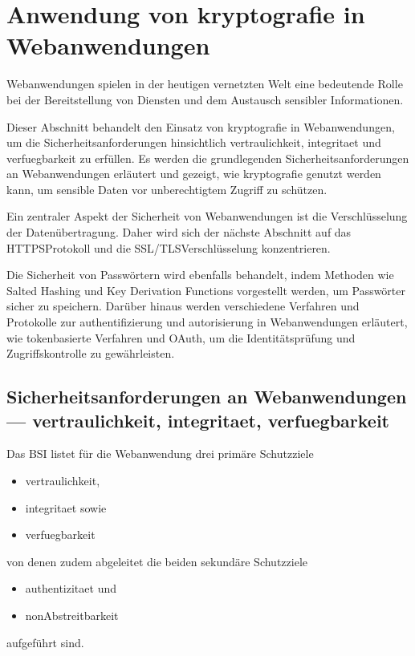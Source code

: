 \newpage
\section[Anwendung von Kryptografie in Webanwendungen]{Anwendung von \gls{kryptografie} in Webanwendungen}\label{sec:anwendung_von_kryptografie_in_webanwendungen}
Webanwendungen spielen in der heutigen vernetzten Welt eine bedeutende Rolle bei der Bereitstellung von Diensten und dem Austausch sensibler Informationen.

Dieser Abschnitt behandelt den Einsatz von \Gls{kryptografie} in Webanwendungen, um die Sicherheitsanforderungen hinsichtlich \gls{vertraulichkeit}, \gls{integritaet} und \gls{verfuegbarkeit} zu erfüllen.
Es werden die grundlegenden Sicherheitsanforderungen an Webanwendungen erläutert und gezeigt, wie \Gls{kryptografie} genutzt werden kann, um sensible Daten vor unberechtigtem Zugriff zu schützen.

Ein zentraler Aspekt der Sicherheit von Webanwendungen ist die Verschlüsselung der Datenübertragung.
Daher wird sich der nächste Abschnitt auf das \ac{HTTPS}\nonbreakdash Protokoll und die \ac{SSL}/\ac{TLS}\nonbreakdash Verschlüsselung konzentrieren.

Die Sicherheit von Passwörtern wird ebenfalls behandelt, indem Methoden wie Salted Hashing und Key Derivation Functions vorgestellt werden, um Passwörter sicher zu speichern.
Darüber hinaus werden verschiedene Verfahren und Protokolle zur \gls{authentifizierung} und \gls{autorisierung} in Webanwendungen erläutert, wie \zb tokenbasierte Verfahren und OAuth, um die Identitätsprüfung und Zugriffskontrolle zu gewährleisten.

\subsection[Sicherheitsanforderungen an Webanwendungen]{Sicherheitsanforderungen an Webanwendungen — \gls{vertraulichkeit}, \gls{integritaet}, \gls{verfuegbarkeit}}\label{subsec:sicherheitsanforderungen-an-webanwendungen}

Das \ac{BSI} listet für die Webanwendung drei primäre Schutzziele
\begin{samepage}
    \begin{itemize}
        \item \gls{vertraulichkeit},
        \item \gls{integritaet} sowie
        \item \gls{verfuegbarkeit}
    \end{itemize}
\end{samepage}
von denen zudem abgeleitet \ua die beiden sekundäre Schutzziele
\begin{samepage}
    \begin{itemize}
        \item \gls{authentizitaet} und
        \item \gls{nonAbstreitbarkeit}
    \end{itemize}
\end{samepage}
aufgeführt sind\autocite[\pagef~8]{bsi-leitfaden-2022}.

